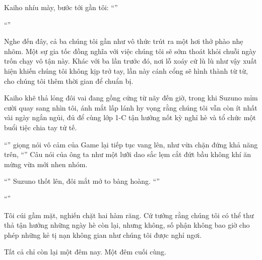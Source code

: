 \documentclass[../main.tex]{subfiles}
\begin{document}
Kaiho nhíu mày, bước tới gần tôi: ``''

``''

Nghe đến đây, cả ba chúng tôi gần như vô thức trút ra một hơi thở phào nhẹ nhõm. Một sự gia tốc đồng nghĩa với việc chúng tôi sẽ sớm thoát khỏi chuỗi ngày trốn chạy vô tận này. Khác với ba lần trước đó, nơi lỗ xoáy cứ lù lù như vậy xuất hiện khiến chúng tôi không kịp trở tay, lần này cánh cổng sẽ hình thành từ từ, cho chúng tôi thêm thời gian để chuẩn bị.

Kaiho khẽ thả lỏng đôi vai đang gồng cứng từ nãy đến giờ, trong khi Suzuno mỉm cười quay sang nhìn tôi, ánh mắt lấp lánh hy vọng rằng chúng tôi vẫn còn ít nhất vài ngày ngắn ngủi, đủ để cùng lớp 1-C tận hưởng nốt kỳ nghỉ hè và tổ chức một buổi tiệc chia tay tử tế.

``'' giọng nói vô cảm của Game lại tiếp tục vang lên, như vừa chặn đứng khả năng trên, ``'' Câu nói của ông ta như một lưỡi dao sắc lẹm cắt đứt bầu không khí ăn mừng vừa mới nhen nhóm.

``'' Suzuno thốt lên, đôi mắt mở to bàng hoàng. ``''

``''

Tôi cúi gầm mặt, nghiến chặt hai hàm răng. Cứ tưởng rằng chúng tôi có thể thư thả tận hưởng những ngày hè còn lại, nhưng không, số phận không bao giờ cho phép những kẻ tị nạn không gian như chúng tôi được nghỉ ngơi.

Tất cả chỉ còn lại một đêm nay. Một đêm cuối cùng.
\end{document}
